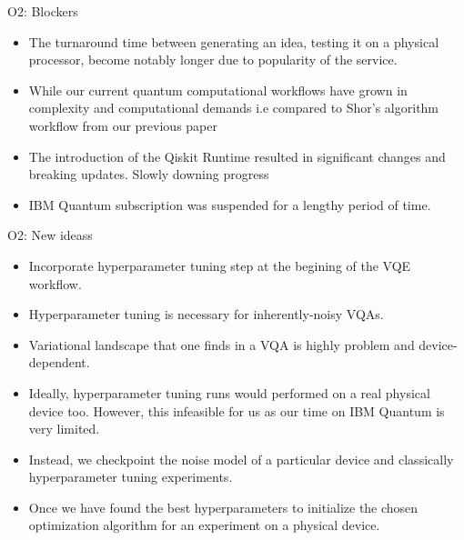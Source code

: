 \begin{frame}{O2: Blockers}
  \begin{itemize}
    \setlength\itemsep{0.1em}
    \item The turnaround time between generating an idea, testing it on a physical processor,
          become notably longer due to popularity of the service.

    \item While our current quantum computational workflows have grown in complexity and computational demands
      i.e compared to Shor's algorithm workflow from our previous paper

    \item The introduction of the Qiskit Runtime resulted in significant changes and breaking updates. Slowly downing progress

    \item IBM Quantum subscription was suspended for a lengthy period of time.
  \end{itemize}
\end{frame}

\begin{frame}{O2: New ideass}
  \begin{itemize}
    \setlength\itemsep{0.1em}
    \item Incorporate hyperparameter tuning step at the begining of the VQE workflow.

    \item {\color{red}Hyperparameter tuning} is necessary for inherently-noisy VQAs.

    \item Variational landscape that one finds in a VQA is highly problem and device-dependent.

    \item Ideally, hyperparameter tuning runs would performed on a real physical device too.
          However, this infeasible for us as our time on IBM Quantum is very limited.

    \item Instead, we checkpoint the noise model of a particular device and classically hyperparameter tuning experiments.

    \item Once we have found the best hyperparameters to initialize the chosen optimization algorithm for an experiment on a physical device.
  \end{itemize}
\end{frame}


